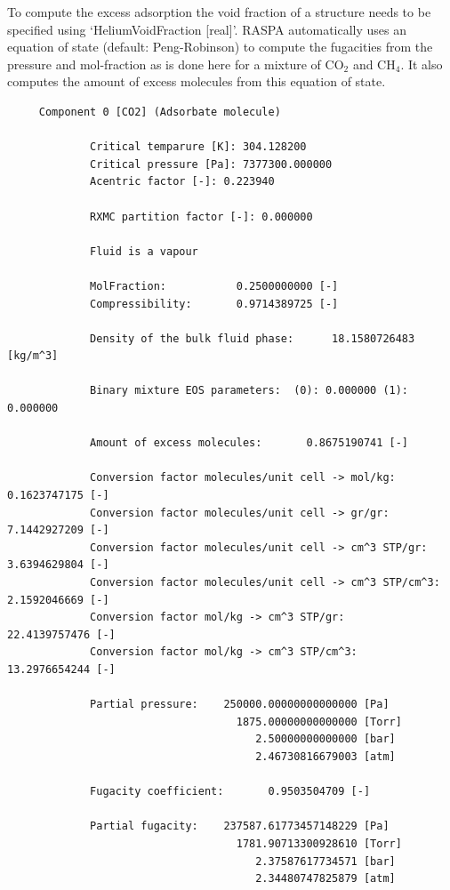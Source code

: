 To compute the excess adsorption the void fraction of a structure needs to be specified using `HeliumVoidFraction [real]'. RASPA automatically uses an
equation of state (default: Peng-Robinson) to compute the fugacities from the pressure and mol-fraction as is done here for a mixture of CO$_2$ and CH$_4$.
It also computes the amount of excess molecules from this equation of state.
\begin{tiny}
\begin{verbatim}
     Component 0 [CO2] (Adsorbate molecule)
     
             Critical temparure [K]: 304.128200
             Critical pressure [Pa]: 7377300.000000
             Acentric factor [-]: 0.223940
     
             RXMC partition factor [-]: 0.000000
     
             Fluid is a vapour
     
             MolFraction:           0.2500000000 [-]
             Compressibility:       0.9714389725 [-]
     
             Density of the bulk fluid phase:      18.1580726483 [kg/m^3]
     
             Binary mixture EOS parameters:  (0): 0.000000 (1): 0.000000
     
             Amount of excess molecules:       0.8675190741 [-]
     
             Conversion factor molecules/unit cell -> mol/kg:       0.1623747175 [-]
             Conversion factor molecules/unit cell -> gr/gr:       7.1442927209 [-]
             Conversion factor molecules/unit cell -> cm^3 STP/gr:       3.6394629804 [-]
             Conversion factor molecules/unit cell -> cm^3 STP/cm^3:       2.1592046669 [-]
             Conversion factor mol/kg -> cm^3 STP/gr:      22.4139757476 [-]
             Conversion factor mol/kg -> cm^3 STP/cm^3:      13.2976654244 [-]
     
             Partial pressure:    250000.00000000000000 [Pa]
                                    1875.00000000000000 [Torr]
                                       2.50000000000000 [bar]
                                       2.46730816679003 [atm]
     
             Fugacity coefficient:       0.9503504709 [-]
     
             Partial fugacity:    237587.61773457148229 [Pa]
                                    1781.90713300928610 [Torr]
                                       2.37587617734571 [bar]
                                       2.34480747825879 [atm]
     

\end{verbatim}
\end{tiny}
